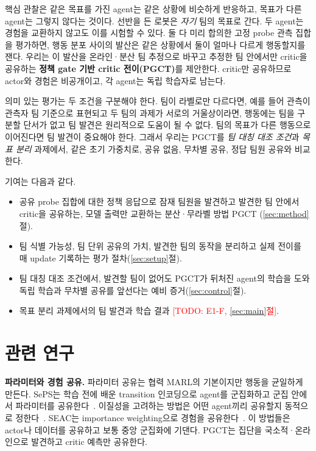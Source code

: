 \documentclass[twocolumn,10pt]{article}
\newcommand{\todo}[1]{\textcolor{red}{[TODO: #1]}}
\newcommand{\ours}{PGCT}
\begin{document}
핵심 관찰은 같은 목표를 가진 agent는 같은 상황에 비슷하게 반응하고, 목표가 다른 agent는 그렇지 않다는 것이다. 선반을 든 로봇은 \emph{자기} 팀의
목표로 간다. 두 agent는 경험을 교환하지 않고도 이를 시험할 수 있다. 둘 다 미리 합의한 고정 probe 관측 집합을 평가하면, 행동 분포 사이의 발산은 같은
상황에서 둘이 얼마나 다르게 행동할지를 잰다. 우리는 이 발산을 온라인·분산 팀 추정으로 바꾸고 추정한 팀 안에서만 critic을 공유하는 \textbf{정책 gate 기반
critic 전이(\ours{})}를 제안한다. critic만 공유하므로 actor와 경험은 비공개이고, 각 agent는 독립 학습자로 남는다.

의미 있는 평가는 두 조건을 구분해야 한다. 팀이 라벨로만 다르다면, 예를 들어 관측이 관측자 팀 기준으로 표현되고 두 팀의 과제가 서로의 거울상이라면,
행동에는 팀을 구분할 단서가 없고 팀 발견은 원리적으로 도움이 될 수 없다. 팀의 목표가 다른 행동으로 이어진다면 팀 발견이 중요해야 한다. 그래서 우리는
\ours{}를 \emph{팀 대칭 대조 조건}과 \emph{목표 분리} 과제에서, 같은 초기 가중치로, 공유 없음, 무차별 공유, 정답 팀원 공유와 비교한다.

기여는 다음과 같다.
\begin{itemize}
  \item 공유 probe 집합에 대한 정책 응답으로 잠재 팀원을 발견하고 발견한 팀 안에서 critic을 공유하는, 모델 출력만 교환하는 분산·무라벨 방법 \ours{}
    (\ref{sec:method}절).
  \item 팀 식별 가능성, 팀 단위 공유의 가치, 발견한 팀의 동작을 분리하고 실제 전이를 매 update 기록하는 평가 절차(\ref{sec:setup}절).
  \item 팀 대칭 대조 조건에서, 발견할 팀이 없어도 \ours{}가 뒤처진 agent의 학습을 도와 독립 학습과 무차별 공유를 앞선다는 예비 증거(\ref{sec:control}절).
  \item 목표 분리 과제에서의 팀 발견과 학습 결과 \todo{E1-F, \ref{sec:main}절}.
\end{itemize}

\section{관련 연구}
\textbf{파라미터와 경험 공유.} 파라미터 공유는 협력 MARL의 기본이지만 행동을 균일하게 만든다. SePS는 학습 전에 배운 transition 인코딩으로 agent를 군집화하고
군집 안에서 파라미터를 공유한다~\cite{christianos2021seps}. 이질성을 고려하는 방법은 어떤 agent끼리 공유할지 동적으로 정한다~\cite{hu2025heterogeneity}. SEAC는
importance weighting으로 경험을 공유한다~\cite{christianos2020seac}. 이 방법들은 actor나 데이터를 공유하고 보통 중앙 군집화에 기댄다. \ours{}는 집단을
국소적·온라인으로 발견하고 critic 예측만 공유한다.
\end{document}
